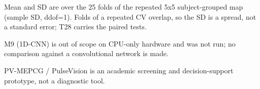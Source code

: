 \begin{table}[htbp]
  \par\footnotesize Mean and SD are over the 25 folds of the repeated 5x5 subject-grouped map (sample SD, ddof=1). Folds of a repeated CV overlap, so the SD is a spread, not a standard error; T28 carries the paired tests.
  \par\footnotesize M9 (1D-CNN) is out of scope on CPU-only hardware and was not run; no comparison against a convolutional network is made.
  \par\footnotesize PV-MEPCG / PulseVision is an academic screening and decision-support prototype, not a diagnostic tool.
\end{table}
